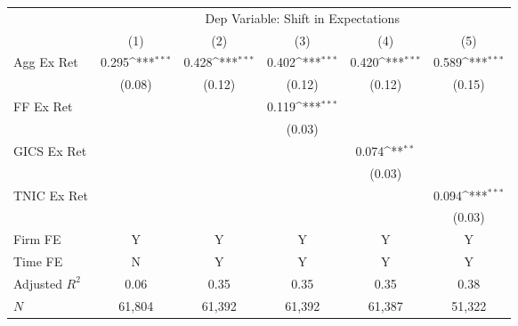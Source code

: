          {         \def\sym#1{\ifmmode^{#1}\else\(^{#1}\)\fi}         \begin{tabular}{l*{5}{c}}         \toprule          &\multicolumn{5}{c}{Dep Variable: Shift in Expectations} \\         \cmidrule(lr){2-6}           &\multicolumn{1}{c}{(1)}&\multicolumn{1}{c}{(2)} &\multicolumn{1}{c}{(3)}         &\multicolumn{1}{c}{(4)}        &\multicolumn{1}{c}{(5)} \\         
\midrule
Agg Ex Ret  &       0.295\sym{***}&       0.428\sym{***}&       0.402\sym{***}&       0.420\sym{***}&       0.589\sym{***}\\
            &      (0.08)         &      (0.12)         &      (0.12)         &      (0.12)         &      (0.15)         \\
FF Ex Ret   &                     &                     &       0.119\sym{***}&                     &                     \\
            &                     &                     &      (0.03)         &                     &                     \\
GICS Ex Ret &                     &                     &                     &       0.074\sym{**} &                     \\
            &                     &                     &                     &      (0.03)         &                     \\
TNIC Ex Ret &                     &                     &                     &                     &       0.094\sym{***}\\
            &                     &                     &                     &                     &      (0.03)         \\
         \cmidrule(lr){1-6}          \multicolumn{1}{l}{Firm FE} & Y&Y&Y&Y&Y \\         \multicolumn{1}{l}{Time FE} & N&Y&Y&Y&Y \\         
Adjusted $R^2$&        0.06         &        0.35         &        0.35         &        0.35         &        0.38         \\
$N$         &      61,804         &      61,392         &      61,392         &      61,387         &      51,322         \\
\bottomrule                         \end{tabular}                         }
